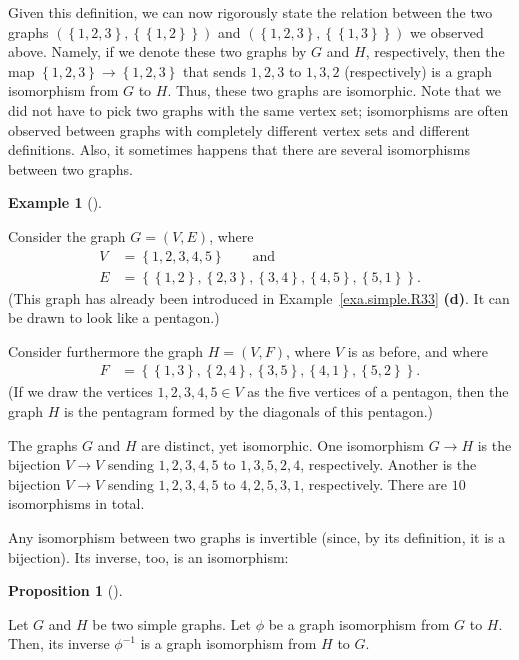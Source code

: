 \documentclass[numbers=enddot,12pt,final,onecolumn,notitlepage]{scrartcl}%
\theoremstyle{definition}
\newtheorem{prop}[theo]{Proposition}
\newenvironment{proposition}[1][]
{\begin{prop}[#1]\begin{leftbar}}
{\end{leftbar}\end{prop}}
\newtheorem{exam}[theo]{Example}
\newenvironment{example}[1][]
{\begin{exam}[#1]\begin{leftbar}}
{\end{leftbar}\end{exam}}
\newcommand{\set}[1]{\left\{ #1 \right\}}
\newcommand{\tup}[1]{\left( #1 \right)}
\begin{document}
Given this definition, we can now rigorously state the relation
between the two graphs $\tup{\set{1,2,3},\set{\set{1,2}}}$ and
$\tup{\set{1,2,3},\set{\set{1,3}}}$ we observed above. Namely, if we
denote these two graphs by $G$ and $H$, respectively, then the map
$\set{1,2,3} \to \set{1,2,3}$ that sends $1,2,3$ to $1,3,2$
(respectively) is a graph isomorphism from $G$ to $H$. Thus, these two
graphs are isomorphic. Note that we did not have to pick two graphs
with the same vertex set; isomorphisms are often observed between
graphs with completely different vertex sets and different
definitions. Also, it sometimes happens that there are several
isomorphisms between two graphs.

\begin{example} \label{exa.intro.iso.pentagon}
Consider the graph $G = \tup{V, E}$, where
\begin{align*}
V &= \set{1, 2, 3, 4, 5} \qquad \text{and} \\
E &= \set{\set{1,2}, \set{2,3}, \set{3,4}, \set{4,5}, \set{5,1}} .
\end{align*}
(This graph has already been introduced in
Example~\ref{exa.simple.R33} \textbf{(d)}. It can be drawn to look
like a pentagon.)

Consider furthermore the graph $H = \tup{V, F}$, where $V$ is as
before, and where
\begin{align*}
F &= \set{\set{1,3}, \set{2,4}, \set{3,5}, \set{4,1}, \set{5,2}} .
\end{align*}
(If we draw the vertices $1,2,3,4,5 \in V$ as the five vertices of a
pentagon, then the graph $H$ is the pentagram formed by the diagonals
of this pentagon.)

The graphs $G$ and $H$ are distinct, yet isomorphic. One isomorphism
$G \to H$ is the bijection $V \to V$ sending $1,2,3,4,5$ to
$1,3,5,2,4$, respectively. Another is the bijection $V \to V$ sending
$1,2,3,4,5$ to $4,2,5,3,1$, respectively. There are $10$ isomorphisms
in total.
\end{example}

Any isomorphism between two graphs is invertible (since, by its
definition, it is a bijection). Its inverse, too, is an isomorphism:

\begin{proposition} \label{prop.intro.iso.inverse}
Let $G$ and $H$ be two simple graphs. Let $\phi$ be a graph
isomorphism from $G$ to $H$. Then, its inverse $\phi^{-1}$ is a graph
isomorphism from $H$ to $G$.
\end{proposition}
\end{document}

